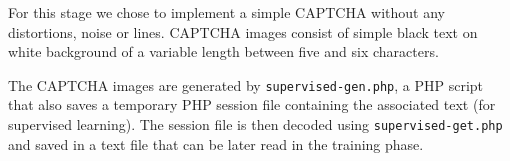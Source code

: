\documentclass[a4paper,12pt]{article}
\begin{document}
For this stage we chose to implement a simple CAPTCHA without any distortions,
noise or lines. CAPTCHA images consist of simple black text on white
background of a variable length between five and six characters.

The CAPTCHA images are generated by \texttt{supervised-gen.php}, a PHP
script that also saves a temporary PHP session file containing the associated
text (for supervised learning). The session file is then decoded using 
\texttt{supervised-get.php} and saved in a text file that can be later
read in the training phase.

\vskip 0.2in


\end{document}
